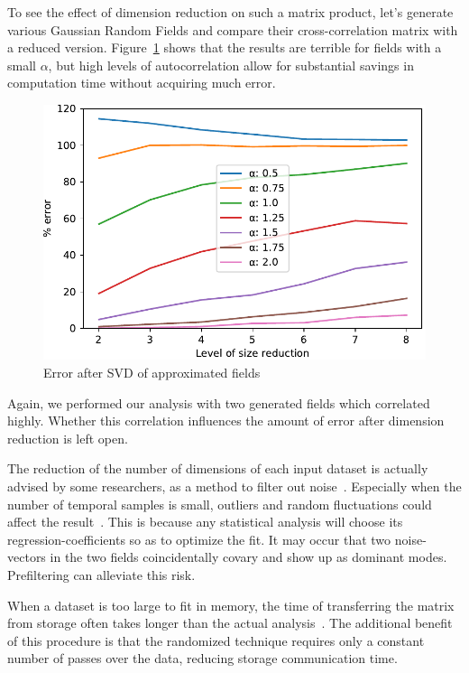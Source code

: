 \documentclass[sigconf]{acmart}
\begin{document}
To see the effect of dimension reduction on such a matrix product, let's generate various Gaussian Random Fields and compare their cross-correlation matrix with a reduced version. Figure~\ref{fig:plotRandomisedSizeReducedMatrixProduct} shows that the results are terrible for fields with a small $\alpha$, but high levels of autocorrelation allow for substantial savings in computation time without acquiring much error.

\begin{figure}[h]
\begin{center}
\includegraphics[width=0.8\columnwidth]{Results/plotRandomisedSizeReducedMatrixProduct.pdf}
\caption[Error after SVD]{Error after SVD of approximated fields}
\label{fig:plotRandomisedSizeReducedMatrixProduct}
\end{center}
\end{figure}

Again, we performed our analysis with two generated fields which correlated highly. Whether this correlation influences the amount of error after dimension reduction is left open.

The reduction of the number of dimensions of each input dataset is actually advised by some researchers, as a method to filter out noise~\cite{Barnett1987}. Especially when the number of temporal samples is small, outliers and random fluctuations could affect the result~\cite{Bretherton1992}. This is because any statistical analysis will choose its regression-coefficients so as to optimize the fit. It may occur that two noise-vectors in the two fields coincidentally covary and show up as dominant modes. Prefiltering can alleviate this risk.

When a dataset is too large to fit in memory, the time of transferring the matrix from storage often takes longer than the actual analysis~\cite{Halko2011}. The additional benefit of this procedure is that the randomized technique requires only a constant number of passes over the data, reducing storage communication time.
\end{document}
